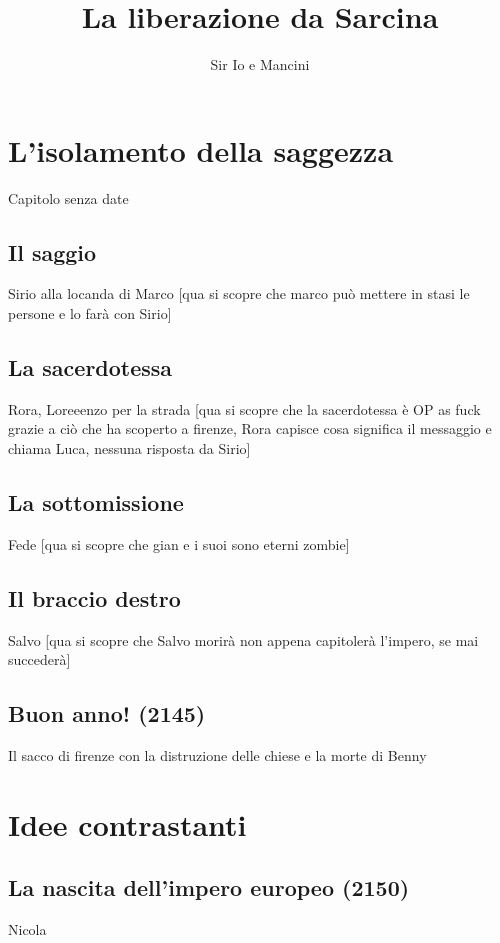 \documentclass{book}
\title{La liberazione da Sarcina}
\author{Sir Io e Mancini}
\date{}
\begin{document}
\maketitle
\tableofcontents

  
\chapter{L'isolamento della saggezza}
Capitolo senza date
\section{Il saggio}
Sirio alla locanda di Marco [qua si scopre che marco può mettere in stasi le persone e lo farà con Sirio]

\section{La sacerdotessa}
Rora, Loreeenzo per la strada [qua si scopre che la sacerdotessa è OP as fuck grazie a ciò che ha scoperto a firenze, Rora capisce cosa significa il messaggio e chiama Luca, nessuna risposta da Sirio]

\section{La sottomissione}
Fede [qua si scopre che gian e i suoi sono eterni zombie]

\section{Il braccio destro}
Salvo [qua si scopre che Salvo morirà non appena capitolerà l'impero, se mai succederà]

\section{Buon anno! (2145)}
Il sacco di firenze con la distruzione delle chiese e la morte di Benny


\chapter{Idee contrastanti}

\section{La nascita dell'impero europeo (2150)}
Nicola
\end{document}
